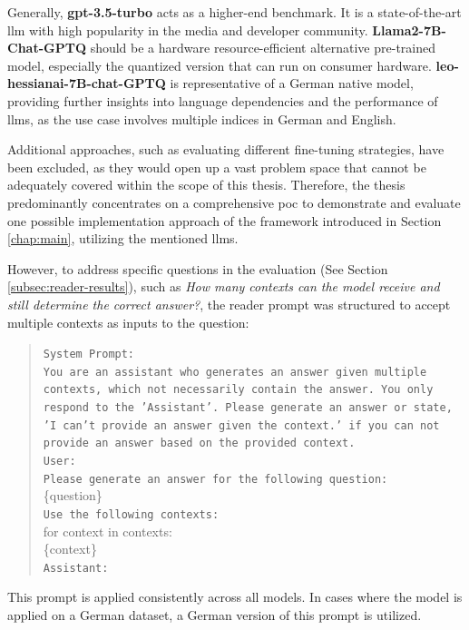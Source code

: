 Generally, \textbf{gpt-3.5-turbo} acts as a higher-end benchmark. It is a state-of-the-art \gls{llm} with high popularity in the media and developer community. \textbf{Llama2-7B-Chat-GPTQ} should be a hardware resource-efficient alternative pre-trained model, especially the quantized version that can run on consumer hardware. \textbf{leo-hessianai-7B-chat-GPTQ} is representative of a German native model, providing further insights into language dependencies and the performance of \gls{llm}s, as the use case involves multiple indices in German and English.

Additional approaches, such as evaluating different fine-tuning strategies, have been excluded, as they would open up a vast problem space that cannot be adequately covered within the scope of this thesis. Therefore, the thesis predominantly concentrates on a comprehensive \gls{poc} to demonstrate and evaluate one possible implementation approach of the framework introduced in Section \ref{chap:main}, utilizing the mentioned \gls{llm}s.

However, to address specific questions in the evaluation (See Section \ref{subsec:reader-results}), such as \textit{How many contexts can the model receive and still determine the correct answer?}, the reader prompt was structured to accept multiple contexts as inputs to the question:

\begin{quote}
    \texttt{System Prompt:} \\
    \texttt{You are an assistant who generates an answer given multiple contexts, which not necessarily contain the answer. You only respond to the 'Assistant'. Please generate an answer or state, 'I can't provide an answer given the context.' if you can not provide an answer based on the provided context.} \\
    \texttt{User:} \\
    \texttt{Please generate an answer for the following question:} \\
    \{question\} \\
    \texttt{Use the following contexts:} \\
    for context in contexts: \\
    \{context\} \\
    \texttt{Assistant:} \\
\end{quote}

This prompt is applied consistently across all models. In cases where the model is applied on a German dataset, a German version of this prompt is utilized.


